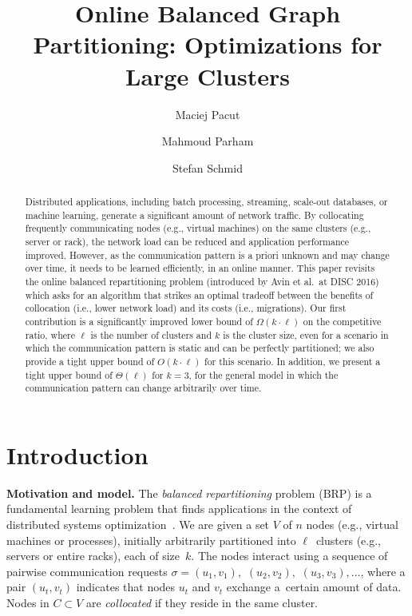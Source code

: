 \documentclass[manuscript,screen=true, review, anonymous]{acmart}
\title{Online Balanced Graph Partitioning: Optimizations for Large Clusters}
\author{Maciej Pacut}
\affiliation{%
 \institution{Faculty of Computer Science, University of Vienna}
 \country{Austria}
 }
\author{Mahmoud Parham}
\affiliation{%
 \institution{Faculty of Computer Science, University of Vienna}
 \country{Austria}
 }
\author{Stefan Schmid}
\affiliation{%
 \institution{Faculty of Computer Science, University of Vienna}
 \country{Austria}
 }
\newcommand{\OBRP}{BRP}
\begin{document}
\begin{abstract}
	Distributed   applications,  including  batch  processing, streaming, scale-out databases,
	or machine learning, generate a significant amount of network traffic. By collocating frequently communicating nodes (e.g., virtual machines) on the same clusters (e.g., server or rack), the network load can be reduced and application performance improved. 
	However, as the communication pattern is a priori unknown and may change over time, it needs to be learned efficiently, in an online manner.
	This paper revisits the online 
	balanced repartitioning problem 
	(introduced by Avin et al.~at DISC 2016)
	which asks for an algorithm that strikes
	an optimal tradeoff between the benefits
	of collocation (i.e., lower network load) 
	and its costs (i.e., migrations). 
	Our first contribution is a significantly improved
	lower bound of $\Omega(k\cdot \ell)$ on the
	competitive ratio, where $\ell$ is the number
	of clusters and $k$ is the cluster size,
	even for a scenario in which the communication
	pattern is static and can be perfectly partitioned;
	we also provide a tight upper bound 
	of $O(k\cdot \ell)$ for this scenario.
	In addition, we present a tight upper bound
	of $\Theta(\ell)$ for $k=3$,
	for the general model in which the
	communication pattern can change arbitrarily
	over time. 
\end{abstract}

\maketitle

\renewcommand{\shortauthors}{M.~Pacut, M.~Parham, S.~Schmid}

\section{Introduction}

\noindent \textbf{Motivation and model.}
The \emph{balanced repartitioning} problem (\OBRP{})
is a fundamental learning problem
that finds applications in the context of
distributed systems optimization~\cite{repartition-disc}. We are given a set $V$ of $n$ nodes 
(e.g., virtual machines or processes),
initially arbitrarily partitioned into $\ell$~clusters
(e.g., servers or entire racks),
each of size~$k$.
The nodes interact using
a sequence of pairwise communication requests
$\sigma = (u_1,v_1),$ $(u_2,v_2),$ $(u_3,v_3), \ldots$,
where a pair $(u_t,v_t)$ indicates that nodes $u_t$ and $v_t$ exchange a~certain amount of data.
Nodes in $C \subset V$ are \emph{collocated}
if they reside in the same cluster.
\end{document}
